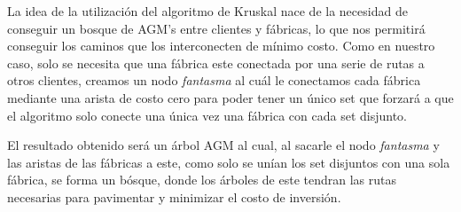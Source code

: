 \documentclass[a4paper, 10pt, twoside]{article}
\begin{document}
La idea de la utilización del algoritmo de Kruskal nace de la necesidad de conseguir un bosque de AGM's entre clientes y fábricas, lo que nos permitirá conseguir los caminos que los interconecten de mínimo costo. Como en nuestro caso, solo se necesita que una fábrica este conectada por una serie de rutas a otros clientes, creamos un nodo \textit{fantasma} al cuál le conectamos cada fábrica mediante una arista de costo cero para poder tener un único set que forzará a que el algoritmo solo conecte una única vez una fábrica con cada set disjunto.

El resultado obtenido será un árbol AGM al cual, al sacarle el nodo \textit{fantasma} y las aristas de las fábricas a este, como solo se unían los set disjuntos con una sola fábrica, se forma un bósque, donde los árboles de este tendran las rutas necesarias para pavimentar y minimizar el costo de inversión.
\end{document}

